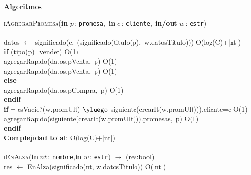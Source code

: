 \documentclass[10pt, a4paper]{article}
\let\NombreFuncion=\textsc
\let\TipoVariable=\texttt
\let\ModificadorArgumento=\textbf
\newcommand{\tab}{\hspace*{7mm}}
\newcommand{\In}[2]{\ModificadorArgumento{in} \ensuremath{#1}\,: \TipoVariable{#2}\xspace}
\newcommand{\Inout}[2]{\ModificadorArgumento{in/out} \ensuremath{#1}\,: \TipoVariable{#2}\xspace}
\newenvironment{Algoritmos}{%
  \vspace*{2ex}%
  \noindent\textbf{\Large Algoritmos}%
  \vspace*{2ex}%
}{}
\begin{document}
\begin{Algoritmos}
\NombreFuncion{iAgregarPromesa}(\In{p}{promesa},\ \In{c}{cliente},\ \Inout{w}{estr})\\
\\ 
\tab datos $\leftarrow$ significado(c,\ (significado(titulo(p),\ w.datosTitulo))) \hfill O(log(C)+|nt|)
\\
\tab \textbf{if} (tipo(p)=vender) \hfill O(1)
\\
\tab \tab agregarRapido(datos.pVenta,\ p) \hfill O(1)
\\
\tab \tab agregarRapido(datos.pVenta,\ p) \hfill O(1)
\\
\tab \textbf{else}
\\
\tab \tab agregarRapido(datos.pCompra,\ p) \hfill O(1)
\\
\tab \textbf{endif}
\\
\tab \textbf{if} $\neg$ esVacio?(w.promUlt) $\yluego$ siguiente(crearIt(w.promUlt))).cliente=c \hfill O(1)
\\
\tab \tab agregarRapido(siguiente(crearIt(w.promUlt))).promesas,\ p) \hfill O(1)
\\
\tab \textbf{endif}
\\
\textbf{Complejidad total}: O(log(C)+|nt|)
\\ \\
\NombreFuncion{iEnAlza}(\In{nt}{nombre},\In {w}{estr}) $\rightarrow$ (res:bool)
\\
\tab res $\leftarrow$ EnAlza(significado(nt, w.datosTitulo)) \hfill O(|nt|)
\\ \\

\end{Algoritmos}
\end{document}
